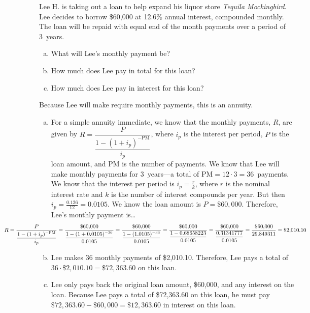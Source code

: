 \documentclass[11pt,letterpaper]{article}
\begin{document}

 Lee H. is taking out a loan to help expand his liquor store \textit{Tequila Mockingbird}. Lee decides to borrow \$60,000 at 12.6\% annual interest, compounded monthly. The loan will be repaid with equal end of the month payments over a period of 3~years. 
	\begin{enumerate}[(a)]
	\item What will Lee's monthly payment be?
	\item How much does Lee pay in total for this loan?
	\item How much does Lee pay in interest for this loan?
	\end{enumerate} \pspace

\sol Because Lee will make require monthly payments, this is an annuity. 
\begin{enumerate}[(a)]
\item For a simple annuity immediate, we know that the monthly payments, $R$, are given by $R= \dfrac{P}{\dfrac{1 - (1 + i_p)^{-\text{PM}}}{i_p}}$, where $i_p$ is the interest per period, $P$ is the loan amount, and PM is the number of payments. We know that Lee will make monthly payments for 3~years---a total of $\text{PM}= 12 \cdot 3= 36$~payments. We know that the interest per period is $i_p= \frac{r}{k}$, where $r$ is the nominal interest rate and $k$ is the number of interest compounds per year. But then $i_p= \frac{0.126}{12}= 0.0105$. We know the loan amount is $P= \$60,\!000$. Therefore, Lee's monthly payment is\dots
	\[
	\hspace{-3cm} R= \dfrac{P}{\dfrac{1 - (1 + i_p)^{-\text{PM}}}{i_p}}= \dfrac{\$60,\!000}{\dfrac{1 - (1 + 0.0105)^{-36}}{0.0105}}= \dfrac{\$60,\!000}{\dfrac{1 - (1.0105)^{-36}}{0.0105}}= \dfrac{\$60,\!000}{\dfrac{1 - 0.68658223}{0.0105}}= \dfrac{\$60,\!000}{\dfrac{0.31341777}{0.0105}}= \dfrac{\$60,\!000}{29.849311}= \$2,\!010.10
	\] \pspace

\item Lee makes 36 monthly payments of \$2,010.10. Therefore, Lee pays a total of $36 \cdot \$2,\!010.10= \$72,\!363.60$ on this loan. \pspace

\item Lee only pays back the original loan amount, \$60,000, and any interest on the loan. Because Lee pays a total of \$72,363.60 on this loan, he must pay $\$72,\!363.60 - \$60,\!000= \$12,\!363.60$ in interest on this loan. 
\end{enumerate}
\end{document}
